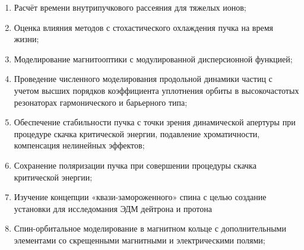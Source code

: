 \begin{enumerate}[beginpenalty=10000] %
  \item Расчёт времени внутрипучкового рассеяния для тяжелых ионов;
  \item Оценка влияния методов с стохастического охлаждения пучка на время жизни;
  \item Моделирование магнитооптики с модулированной дисперсионной функцией;
  \item Проведение численного моделирования продольной динамики частиц с учетом высших порядков коэффициента уплотнения орбиты в высокочастотых резонаторах гармонического и барьерного типа;
  \item Обеспечение стабильности пучка с точки зрения динамической апертуры при процедуре скачка критической энергии, подавление хроматичности, компенсация нелинейных эффектов;
  \item Сохранение поляризации пучка при совершении процедуры скачка критической энергии;
  \item Изучение концепции «квази-замороженного» спина с целью создание установки для исследомания ЭДМ дейтрона и протона
  \item Спин-орбитальное моделирование в магнитном кольце с дополнительными элементами со скрещенными магнитными и электрическими полями;
\end{enumerate}
~\\
\par {\novelty}
